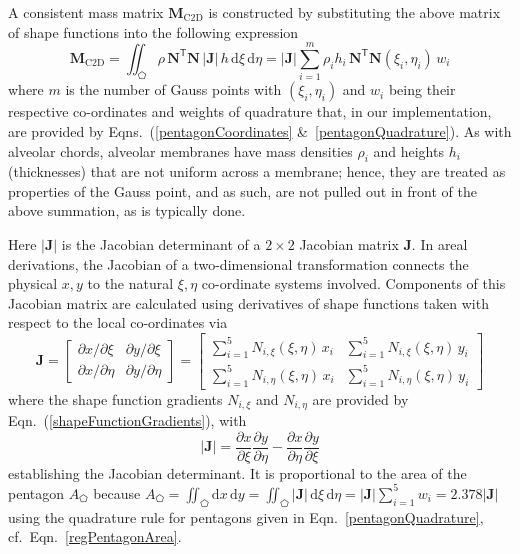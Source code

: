 A consistent mass matrix $\mathbf{M}_{\mathrm{C2D}}$ is constructed by substituting the above matrix of shape functions into the following expression
\begin{equation}
    \mathbf{M}_{\mathrm{C2D}} = \iint_{\pentagon} \rho \, \mathbf{N}^{\mathsf{T}} \mathbf{N} \,|\mathbf{J}| \, h \, \mathrm{d} \xi \, \mathrm{d} \eta 
    = | \mathbf{J} | \sum_{i=1}^m \rho_i h_i \, \mathbf{N}^{\mathsf{T}} \mathbf{N} 
    (\xi_i , \eta_i) \, w_i
    \label{massintegral2d}
\end{equation}
where $m$ is the number of Gauss points with $( \xi_i , \eta_i )$ and $w_i$ being their respective co-ordinates and weights of quadrature that, in our implementation, are provided by Eqns.~(\ref{pentagonCoordinates} \&\ \ref{pentagonQuadrature}).  As with alveolar chords, alveolar membranes have mass densities $\rho_i$ and heights $h_i$ (thicknesses) that are not uniform across a membrane; hence, they are treated as properties of the Gauss point, and as such, are not pulled out in front of the above summation, as is typically done.

Here $|\mathbf{J}|$ is the Jacobian determinant of a $2 \! \times \! 2$ Jacobian matrix $\mathbf{J}$.  In areal derivations, the Jacobian of a two-dimensional transformation connects the physical ${x, y}$ to the natural ${\xi, \eta}$ co-ordinate systems involved.  Components of this Jacobian matrix are calculated using derivatives of shape functions taken with respect to the local co-ordinates via \cite[pg.~424]{Reddy93}
\begin{equation}
\mathbf{J} = 
\begin{bmatrix}
\partial x / \partial\xi & \partial y / \partial\xi \\
\partial x / \partial\eta & \partial y / \partial\eta 
\end{bmatrix}  
= \begin{bmatrix}
\sum\nolimits_{i=1}^5 N_{i,\xi} (\xi,\eta) \, x_i & \sum\nolimits_{i=1}^5 N_{i,\xi} (\xi,\eta) \, y_i \\
\sum\nolimits_{i=1}^5 N_{i,\eta} (\xi,\eta) \, x_i & \sum\nolimits_{i=1}^5 N_{i,\eta} (\xi,\eta) \, y_i
\end{bmatrix}
\label{jacobian2D}
\end{equation}
where the shape function gradients $N_{i,\xi}$ and $N_{i,\eta}$ are provided by Eqn.~(\ref{shapeFunctionGradients}), with
\begin{equation}
| \mathbf{J} | = \frac{\partial x}{\partial \xi} \frac{\partial y}{\partial \eta} - 
\frac{\partial x}{\partial \eta} \frac{\partial y}{\partial \xi}
\label{jacobianpent}
\end{equation}
establishing the Jacobian determinant.  It is proportional to the area of the pentagon $A_{\pentagon}$ because $A_{\pentagon} = \iint_{\pentagon} \mathrm{d}x \, \mathrm{d}y = \iint_{\pentagon} | \mathbf{J} | \, \mathrm{d}\xi \, \mathrm{d}\eta = | \mathbf{J} | \sum_{i=1}^5 w_i = 2.378 | \mathbf{J} |$ using the quadrature rule for pentagons given in Eqn.~\eqref{pentagonQuadrature}, cf.\ Eqn.~\eqref{regPentagonArea}.

